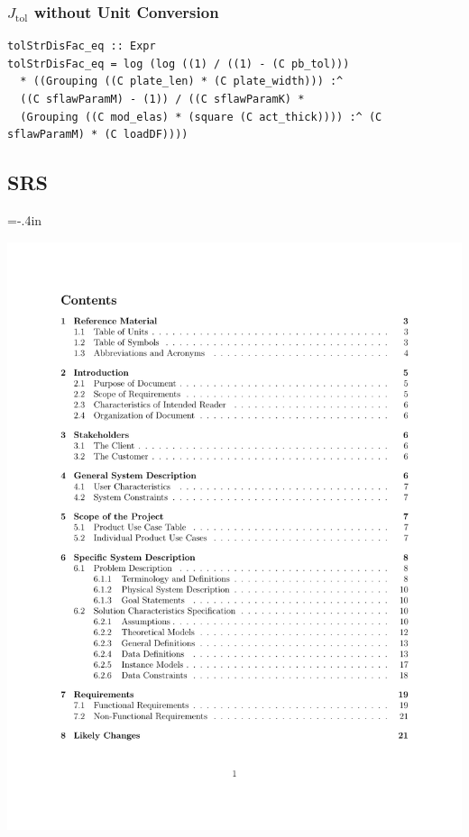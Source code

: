 \documentclass{beamer}
\begin{document}

\begin{frame}

\frametitle{$J_{\mbox{tol}}$ without Unit Conversion}

\begin{lstlisting}
tolStrDisFac_eq :: Expr
tolStrDisFac_eq = log (log ((1) / ((1) - (C pb_tol)))
  * ((Grouping ((C plate_len) * (C plate_width))) :^
  ((C sflawParamM) - (1)) / ((C sflawParamK) *
  (Grouping ((C mod_elas) * (square (C act_thick)))) :^ (C sflawParamM) * (C loadDF))))
\end{lstlisting}
\end{frame}


\subsection[SRS]{SRS}


\hoffset=-.4in %

\begin{frame}


\begin{center}
\includegraphics[scale=0.45]{TofC.pdf}
\end{center}

\end{frame}
\hoffset=0in
\end{document}
